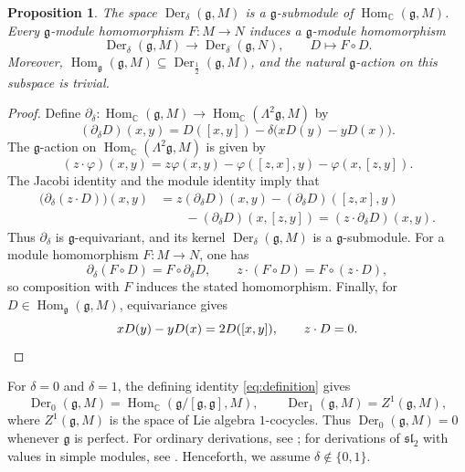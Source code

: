 \documentclass[11pt,reqno]{amsart}
\numberwithin{equation}{section}
\newcommand{\C}{\mathbb C}
\newcommand{\g}{\mathfrak g}
\newcommand{\s}{\mathfrak{sl}_2}
\DeclareMathOperator{\Der}{Der}
\DeclareMathOperator{\Hom}{Hom}
\newtheorem{proposition}[theorem]{Proposition}
\theoremstyle{definition}
\theoremstyle{remark}
\begin{document}
\begin{proposition}\label{prop:basic-properties}
The space \(\Der_\delta(\g,M)\) is a \(\g\)-submodule of
\(\Hom_\C(\g,M)\). Every \(\g\)-module homomorphism
\(F:M\to N\) induces a \(\g\)-module homomorphism
\[
\Der_\delta(\g,M)\longrightarrow\Der_\delta(\g,N),
\qquad D\longmapsto F\circ D.
\]
Moreover, \(\Hom_\g(\g,M)\subseteq\Der_{\frac{1}{2}}(\g,M)\),
and the natural \(\g\)-action on this subspace is trivial.
\end{proposition}
\begin{proof}
Define \(\partial_\delta:\Hom_\C(\g,M)\to
\Hom_\C(\Lambda^2\g,M)\) by
\[
(\partial_\delta D)(x,y)
=D([x,y])-\delta\bigl(xD(y)-yD(x)\bigr).
\]
The \(\g\)-action on \(\Hom_\C(\Lambda^2\g,M)\) is given by
\[
(z\cdot\varphi)(x,y)
=z\varphi(x,y)-\varphi([z,x],y)-\varphi(x,[z,y]).
\]
The Jacobi identity and the module identity imply that
\[
\begin{aligned}
\bigl(\partial_\delta(z\cdot D)\bigr)(x,y)
&=z(\partial_\delta D)(x,y)
 -(\partial_\delta D)([z,x],y)\\
&\qquad -(\partial_\delta D)(x,[z,y])
=(z\cdot\partial_\delta D)(x,y).
\end{aligned}
\]
Thus \(\partial_\delta\) is \(\g\)-equivariant, and its kernel
\(\Der_\delta(\g,M)\) is a \(\g\)-submodule.
For a module homomorphism \(F:M\to N\), one has
\[
\partial_\delta(F\circ D)=F\circ\partial_\delta D,
\qquad z\cdot(F\circ D)=F\circ(z\cdot D),
\]
so composition with \(F\) induces the stated homomorphism.
Finally, for \(D\in\Hom_\g(\g,M)\), equivariance gives
\[
xD(y)-yD(x)=2D([x,y]),\qquad z\cdot D=0.\qedhere
\]
\end{proof}

For \(\delta=0\) and \(\delta=1\), the defining identity \eqref{eq:definition} gives
\[
\Der_0(\g,M)=\Hom_\C(\g/[\g,\g],M),\qquad
\Der_1(\g,M)=Z^1(\g,M),
\]
where \(Z^1(\g,M)\) is the space of Lie algebra
\(1\)-cocycles. Thus \(\Der_0(\g,M)=0\) whenever \(\g\)
is perfect. For ordinary derivations, see \cite{Fuks86,Jacobson62};
for derivations of \(\s\) with values in simple modules, see
\cite{Bavula92}.
Henceforth, we assume \(\delta\notin\{0,1\}\).
\end{document}
